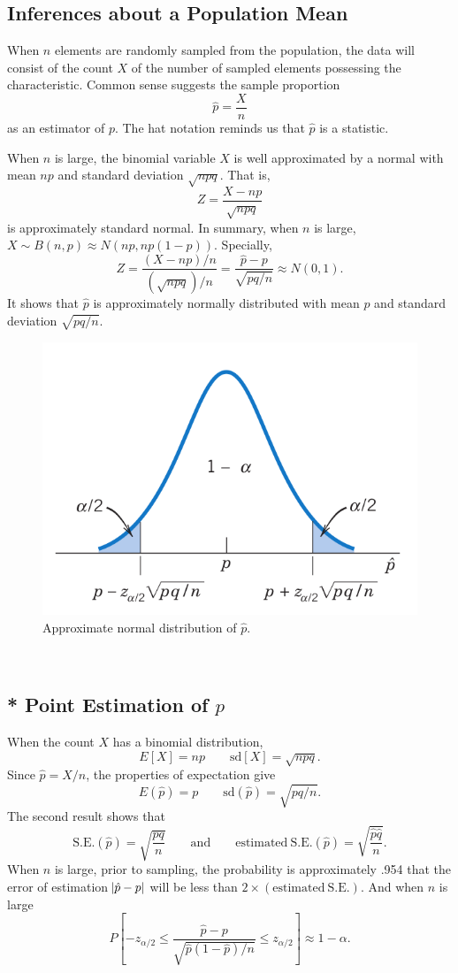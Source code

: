 \documentclass[12pt,a4paper]{article}
\newcommand{\sd}{\text{sd}}
\newcommand{\SE}{\text{S.E.}}
\begin{document}
\subsection{Inferences about a Population Mean}
When $n$ elements are randomly sampled from the population, the data will consist of the count $X$ of the number of sampled elements possessing the characteristic. Common sense suggests the sample proportion \[
\hat{p}=\frac{X}{n}
\] as an estimator of $p$. The hat notation reminds us that $\hat{p}$ is a statistic.\par
When $n$ is large, the binomial variable $X$ is well approximated by a normal with mean $np$ and standard deviation $\sqrt{npq}$. That is, \[
Z=\frac{X-np}{\sqrt{npq}}
\] is approximately standard normal. In summary, when $n$ is large, $X\sim B(n,p)\approx N(np,np(1-p))$. Specially, \[
Z=\frac{(X-np)/n}{(\sqrt{npq})/n}=\frac{\hat{p}-p}{\sqrt{pq/n}}\approx N(0,1).
\] It shows that $\hat{p}$ is approximately normally distributed with mean $p$ and standard deviation $\sqrt{pq/n}$.
\\
\begin{figure}[h!]
	\centering
	\includegraphics[scale=0.3]{8-5.png}
	\caption{Approximate normal distribution of $\hat{p}$.}
\end{figure}\

\newpage
\subsection*{* Point Estimation of $p$}
When the count $X$ has a binomial distribution, \[
E[X]=np\qquad \sd[X]=\sqrt{npq}.
\] Since $\hat{p}=X/n$, the properties of expectation give \[
E(\hat{p})=p\qquad\sd(\hat{p})=\sqrt{pq/n}.
\] The second result shows that \[
\SE(\hat{p})=\sqrt{\frac{pq}{n}}\qquad\text{and}\qquad\text{estimated}\ \SE(\hat{p})=\sqrt{\frac{\hat{p}\hat{q}}{n}}.
\] When $n$ is large, prior to sampling, the probability is approximately .954 that the error of estimation $\abs{\hat{p}-p}$ will be less than $2\times(\text{estimated}\ \SE)$. And when $n$ is large \[
P\left[-z_{\alpha/2}\leq\frac{\hat{p}-p}{\sqrt{\hat{p}(1-\hat{p})/n}}\leq z_{\alpha/2}\right]\approx1-\alpha.
\]
\end{document}
